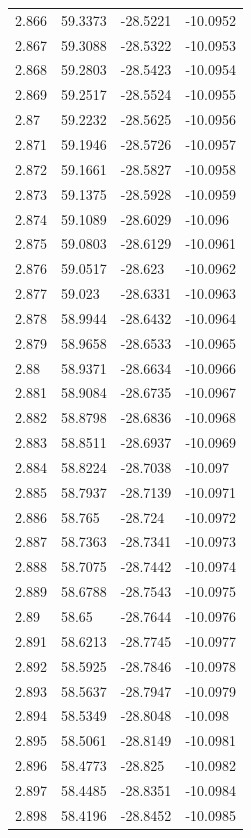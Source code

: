 \begin{tabular}{llll}
2.866 & 59.3373 & -28.5221 & -10.0952 \\
2.867 & 59.3088 & -28.5322 & -10.0953 \\
2.868 & 59.2803 & -28.5423 & -10.0954 \\
2.869 & 59.2517 & -28.5524 & -10.0955 \\
2.87 & 59.2232 & -28.5625 & -10.0956 \\
2.871 & 59.1946 & -28.5726 & -10.0957 \\
2.872 & 59.1661 & -28.5827 & -10.0958 \\
2.873 & 59.1375 & -28.5928 & -10.0959 \\
2.874 & 59.1089 & -28.6029 & -10.096 \\
2.875 & 59.0803 & -28.6129 & -10.0961 \\
2.876 & 59.0517 & -28.623 & -10.0962 \\
2.877 & 59.023 & -28.6331 & -10.0963 \\
2.878 & 58.9944 & -28.6432 & -10.0964 \\
2.879 & 58.9658 & -28.6533 & -10.0965 \\
2.88 & 58.9371 & -28.6634 & -10.0966 \\
2.881 & 58.9084 & -28.6735 & -10.0967 \\
2.882 & 58.8798 & -28.6836 & -10.0968 \\
2.883 & 58.8511 & -28.6937 & -10.0969 \\
2.884 & 58.8224 & -28.7038 & -10.097 \\
2.885 & 58.7937 & -28.7139 & -10.0971 \\
2.886 & 58.765 & -28.724 & -10.0972 \\
2.887 & 58.7363 & -28.7341 & -10.0973 \\
2.888 & 58.7075 & -28.7442 & -10.0974 \\
2.889 & 58.6788 & -28.7543 & -10.0975 \\
2.89 & 58.65 & -28.7644 & -10.0976 \\
2.891 & 58.6213 & -28.7745 & -10.0977 \\
2.892 & 58.5925 & -28.7846 & -10.0978 \\
2.893 & 58.5637 & -28.7947 & -10.0979 \\
2.894 & 58.5349 & -28.8048 & -10.098 \\
2.895 & 58.5061 & -28.8149 & -10.0981 \\
2.896 & 58.4773 & -28.825 & -10.0982 \\
2.897 & 58.4485 & -28.8351 & -10.0984 \\
2.898 & 58.4196 & -28.8452 & -10.0985 \\

\end{tabular}
